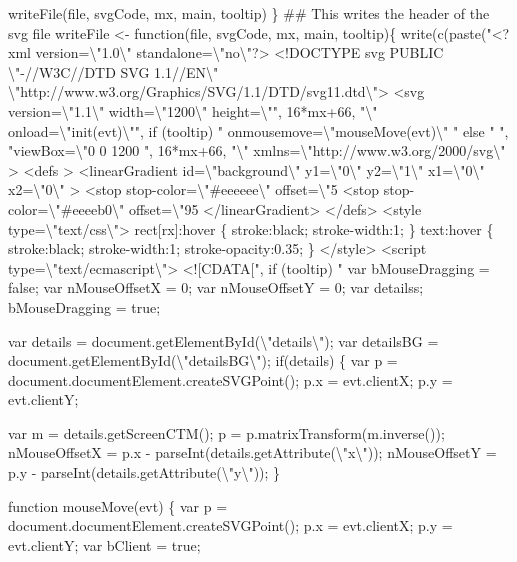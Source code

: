 \documentclass[11pt]{article}
\begin{document}
\begin{nwchunk}
     writeFile(file, svgCode, mx, main, tooltip)
 \}
 ## This writes the header of the svg file
 writeFile <- function(file, svgCode, mx, main, tooltip)\{
     write(c(paste("<?xml version={\textbackslash}"1.0{\textbackslash}" standalone={\textbackslash}"no{\textbackslash}"?>
     <!DOCTYPE svg PUBLIC {\textbackslash}"-//W3C//DTD SVG 1.1//EN{\textbackslash}" {\textbackslash}"http://www.w3.org/Graphics/SVG/1.1/DTD/svg11.dtd{\textbackslash}">
     <svg version={\textbackslash}"1.1{\textbackslash}" width={\textbackslash}"1200{\textbackslash}" height={\textbackslash}"", 16*mx+66, "{\textbackslash}" onload={\textbackslash}"init(evt){\textbackslash}"", if (tooltip) " onmousemove={\textbackslash}"mouseMove(evt){\textbackslash}" " else " ", "viewBox={\textbackslash}"0 0 1200 ", 16*mx+66, "{\textbackslash}" xmlns={\textbackslash}"http://www.w3.org/2000/svg{\textbackslash}" >
     <defs >
     <linearGradient id={\textbackslash}"background{\textbackslash}" y1={\textbackslash}"0{\textbackslash}" y2={\textbackslash}"1{\textbackslash}" x1={\textbackslash}"0{\textbackslash}" x2={\textbackslash}"0{\textbackslash}" >
         <stop stop-color={\textbackslash}"#eeeeee{\textbackslash}" offset={\textbackslash}"5%
         <stop stop-color={\textbackslash}"#eeeeb0{\textbackslash}" offset={\textbackslash}"95%
     </linearGradient>
     </defs>
     <style type={\textbackslash}"text/css{\textbackslash}">
     rect[rx]:hover \{ stroke:black; stroke-width:1; \}
     text:hover \{ stroke:black; stroke-width:1; stroke-opacity:0.35; \}
     </style>
     <script type={\textbackslash}"text/ecmascript{\textbackslash}">
     <![CDATA[",
                   if (tooltip) "
     var bMouseDragging = false;
     var nMouseOffsetX = 0;
     var nMouseOffsetY = 0;
     var detailss;
     bMouseDragging = true;
 
     var details = document.getElementById({\textbackslash}"details{\textbackslash}");
     var detailsBG = document.getElementById({\textbackslash}"detailsBG{\textbackslash}");
     if(details) \{
         var p = document.documentElement.createSVGPoint();
         p.x = evt.clientX;
         p.y = evt.clientY;
     
         var m = details.getScreenCTM();
         p = p.matrixTransform(m.inverse());
         nMouseOffsetX = p.x - parseInt(details.getAttribute({\textbackslash}"x{\textbackslash}"));
         nMouseOffsetY = p.y - parseInt(details.getAttribute({\textbackslash}"y{\textbackslash}"));
     \}
         
     function mouseMove(evt) \{ 
         var p = document.documentElement.createSVGPoint();
         p.x = evt.clientX;
         p.y = evt.clientY;
         var bClient = true;
         

\end{nwchunk}
\end{document}
